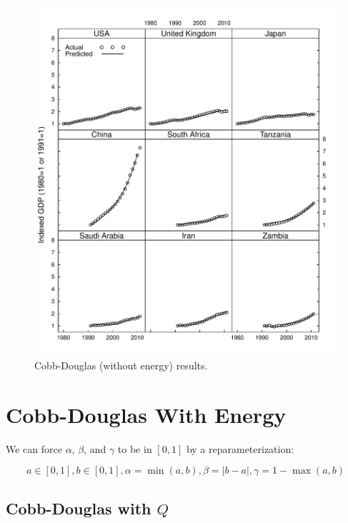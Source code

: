 \documentclass[preprint,authoryear,12pt]{elsarticle}\usepackage{graphicx, color}
\makeatletter
\def\maxwidth{ %
  \ifdim\Gin@nat@width>\linewidth
    \linewidth
  \else
    \Gin@nat@width
  \fi
}
\newenvironment{knitrout}{}{} %
\makeatother
\begin{document}
\begin{knitrout}
\color{fgcolor}\begin{figure}[]

\includegraphics[width=\maxwidth]{figure/CD_Lattice_Graph} \caption[Cobb-Douglas (without energy) results]{Cobb-Douglas (without energy) results.\label{fig:CD_Lattice_Graph}}
\end{figure}


\end{knitrout}


\section{Cobb-Douglas With Energy}

We can force $\alpha$, $\beta$, and $\gamma$ to be in $[0,1]$ by a reparameterization:

\[ a \in[0,1], b \in [0,1], \alpha=\min(a,b), \beta=|b-a|, \gamma = 1-\max(a,b) \]




\subsection{Cobb-Douglas with $Q$}
\end{document}
